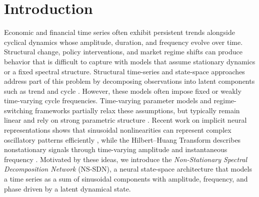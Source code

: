 \section{Introduction}
Economic and financial time series often exhibit persistent trends alongside cyclical dynamics whose amplitude, duration, and frequency evolve over time. Structural change, policy interventions, and market regime shifts can produce behavior that is difficult to capture with models that assume stationary dynamics or a fixed spectral structure.
Structural time-series and state-space approaches address part of this problem by decomposing observations into latent components such as trend and cycle \cite{harvey1989structural,durbin2012statespace}. However, these models often impose fixed or weakly time-varying cycle frequencies. Time-varying parameter models and regime-switching frameworks partially relax these assumptions, but typically remain linear and rely on strong parametric structure \cite{lubik2015tvpvar,hamilton1989regime}.
Recent work on implicit neural representations shows that sinusoidal nonlinearities can represent complex oscillatory patterns efficiently \cite{sitzmann2020siren}, while the Hilbert--Huang Transform describes nonstationary signals through time-varying amplitude and instantaneous frequency \cite{huang1998hht}. Motivated by these ideas, we introduce the \textit{Non-Stationary Spectral Decomposition Network} (NS-SDN), a neural state-space architecture that models a time series as a sum of sinusoidal components with amplitude, frequency, and phase driven by a latent dynamical state.
